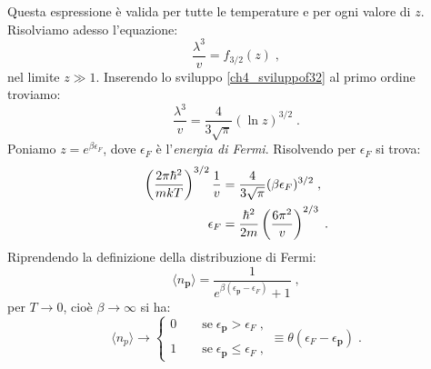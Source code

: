 \documentclass[10pt,a4paper]{report}
\theoremstyle{definition}
\numberwithin{equation}{section}
\newcommand{\bra}{\langle}
\newcommand{\ket}{\rangle}
\begin{document}
Questa espressione è valida per tutte le temperature e per ogni valore di $z$. Risolviamo adesso l'equazione:
$$
\frac{\lambda^3}{v}=f_{3/2}(z)\;,
$$
nel limite $z\gg 1$. Inserendo lo sviluppo \eqref{ch4_sviluppof32} al primo ordine troviamo:
\begin{equation}
\frac{\lambda^3}{v}=\frac{4}{3\sqrt{\pi}}(\ln z)^{3/2}\;.
\end{equation}
Poniamo $z=e^{\beta\epsilon_F}$, dove $\epsilon_F$ è l'\emph{energia di Fermi}. Risolvendo per $\epsilon_F$ si trova:
\begin{align}
\left(\frac{2\pi\hbar^2}{mkT}\right)^{3/2}\frac{1}{v}&=\frac{4}{3\sqrt{\pi}}(\beta\epsilon_F)^{3/2} \notag\;, \\
\epsilon_F &= \frac{\hbar^2}{2m}\left(\frac{6\pi^2}{v}\right)^{2/3}\;.
\end{align}
Riprendendo la definizione della distribuzione di Fermi:
$$
\bra n_{\mathbf{p}}\ket =\frac{1}{e^{\beta(\epsilon_{\mathbf{p}}-\epsilon_F)}+1}\;,
$$
per $T\to 0$, cioè $\beta\to\infty$ si ha:
\begin{equation}
\bra n_p\ket \longrightarrow \begin{cases}
0\qquad \mbox{se}\; \epsilon_{\mathbf{p}}>\epsilon_F\;, \\
\\
1\qquad \mbox{se}\; \epsilon_{\mathbf{p}}\le \epsilon_F\;,
\end{cases}\equiv \theta(\epsilon_F-\epsilon_{\mathbf{p}})\;.
\end{equation}
\end{document}
